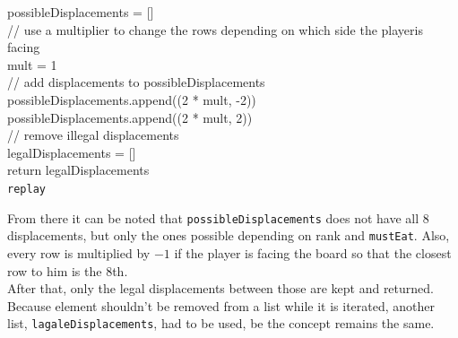 \documentclass[10pt, a4paper]{article}
\begin{document}
	\begin{algorithm}[h]
		\label{alg:getlegaldisplacements}
		possibleDisplacements = []\\
		// use a multiplier to change the rows depending on which side the playeris facing\\
		mult = 1\\
		// add displacements to possibleDisplacements \\
		possibleDisplacements.append((2 * mult, -2))\\
		possibleDisplacements.append((2 * mult, 2))\\
		// remove illegal displacements\\
		legalDisplacements = []\\
		return legalDisplacements\\
		\caption{\texttt{replay}}
	\end{algorithm}
	From there it can be noted that \texttt{possibleDisplacements} does not have all 8 displacements, but only the ones possible depending on rank and \texttt{mustEat}. Also, every row is multiplied by $-1$ if the player is facing the board so that the closest row to him is the 8th.\\
	After that, only the legal displacements between those are kept and returned. Because element shouldn't be removed from a list while it is iterated, another list, \texttt{lagaleDisplacements}, had to be used, be the concept remains the same.
	
\end{document}
